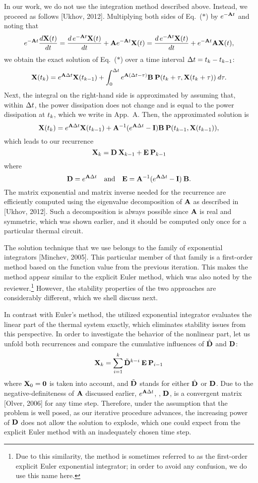 \begin{authors}
In our work, we do not use the integration method described above.
Instead, we proceed as follows [Ukhov, 2012].
Multiplying both sides of Eq.~($\ast$) by $e^{- \mA \t}$ and noting that
\[
  e^{-\mA \t} \frac{d\vX(\t)}{d\t} = \frac{d\, e^{-\mA \t} \vX(\t)}{d\t} + \mA e^{-\mA \t} \vX(\t) = \frac{d\, e^{-\mA \t} \vX(\t)}{d\t} + e^{-\mA \t} \mA \vX(\t),
\]
we obtain the exact solution of Eq.~($\ast$) over a time interval $\Delta t = t_k - t_{k - 1}$:
\[
  \vX(\t_k) = e^{\mA \Delta \t} \vX(\t_{k - 1}) + \int_0^{\Delta \t} e^{\mA (\Delta t - \tau)} \mB \: \vP(\t_k + \tau, \vX(\t_k + \tau)) \: d\tau.
\]
Next, the integral on the right-hand side is approximated by assuming that, within $\Delta t$, the power dissipation does not change and is equal to the power dissipation at $t_k$, which we write in App.~A.
Then, the approximated solution is
\[
  \vX(\t_k) = e^{\mA \Delta \t} \vX(\t_{k - 1}) + \mA^{-1}(e^{\mA \Delta \t} - \mI) \mB \: \vP(\t_{k - 1}, \vX(\t_{k - 1})),
\]
which leads to our recurrence
\[
  \vX_k = \mCF \: \vX_{k - 1} + \mCS \: \vP_{k - 1}
\]
where
\[
  \mCF = e^{\mA \Delta t} \hspace{1em} \text{and} \hspace{1em} \mCS = \mA^{-1} (e^{\mA \Delta \t} - \mI) \: \mB.
\]
The matrix exponential and matrix inverse needed for the recurrence are efficiently computed using the eigenvalue decomposition of $\mA$ as described in [Ukhov, 2012].
Such a decomposition is always possible since $\mA$ is real and symmetric, which was shown earlier, and it should be computed only once for a particular thermal circuit.

The solution technique that we use belongs to the family of exponential integrators [Minchev, 2005].
This particular member of that family is a first-order method based on the function value from the previous iteration.
This makes the method appear similar to the explicit Euler method, which was also noted by the reviewer.\footnote{Due to this similarity, the method is sometimes referred to as the first-order explicit Euler exponential integrator; in order to avoid any confusion, we do use this name here.}
However, the stability properties of the two approaches are considerably different, which we shell discuss next.

In contrast with Euler's method, the utilized exponential integrator evaluates the linear part of the thermal system exactly, which eliminates stability issues from this perspective.
In order to investigate the behavior of the nonlinear part, let us unfold both recurrences and compare the cumulative influences of $\hat{\mCF}$ and $\mCF$:
\[
  \vX_k = \sum_{i = 1}^k \tilde{\mCF}^{k - i} \: \mCS \: \vP_{i - 1}
\]
where $\vX_0 = \mZero$ is taken into account, and $\tilde{\mCF}$ stands for either $\hat{\mCF}$ or $\mCF$.
Due to the negative-definiteness of $\mA$ discussed earlier, $e^{\mA \Delta \t}$, \ie, $\mCF$, is a convergent matrix [Olver, 2006] for any time step.
Therefore, under the assumption that the problem is well posed, as our iterative procedure advances, the increasing power of $\mCF$ does not allow the solution to explode, which one could expect from the explicit Euler method with an inadequately chosen time step.
\end{authors}

